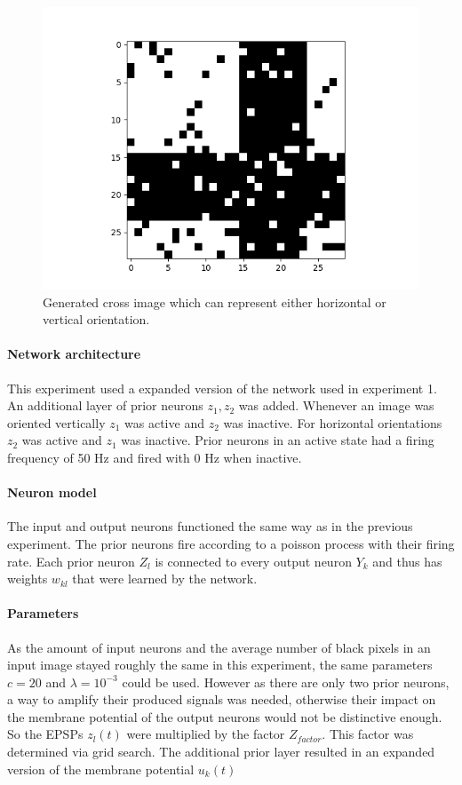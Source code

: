 \begin{figure}
  \includegraphics[width=0.6\linewidth]{figures/horvert/horvertTrainingCrossImage.png}
  \caption{Generated cross image which can represent either horizontal or vertical orientation.}
  \label{fig:horvertTrainingCrossImage}
\end{figure}


\paragraph{Network architecture}

This experiment used a expanded version of the network used in experiment 1. An additional layer of prior neurons $z_1,z_2$ was added. Whenever an image was oriented vertically $z_1$ was active and $z_2$ was inactive. For horizontal orientations $z_2$ was active and $z_1$ was inactive. Prior neurons in an active state had a firing frequency of 50 Hz and fired with 0 Hz when inactive.

\paragraph{Neuron model}
The input and output neurons functioned the same way as in the previous experiment. The prior neurons fire according to a poisson process with their firing rate. Each prior neuron $Z_l$ is connected to every output neuron $Y_k$ and thus has weights $w_{kl}$ that were learned by the network. 

\paragraph{Parameters}
As the amount of input neurons and the average number of black pixels in an input image stayed roughly the same in this experiment, the same parameters $c=  20$ and $\lambda = 10^{-3}$ could be used. However as there are only two prior neurons, a way to amplify their produced signals was needed, otherwise their impact on the membrane potential of the output neurons would not be distinctive enough. So the EPSPs $z_l(t)$ were multiplied by the factor $Z_{factor}$. This factor was determined via grid search. The additional prior layer resulted in an expanded version of the membrane potential $u_k(t)$

